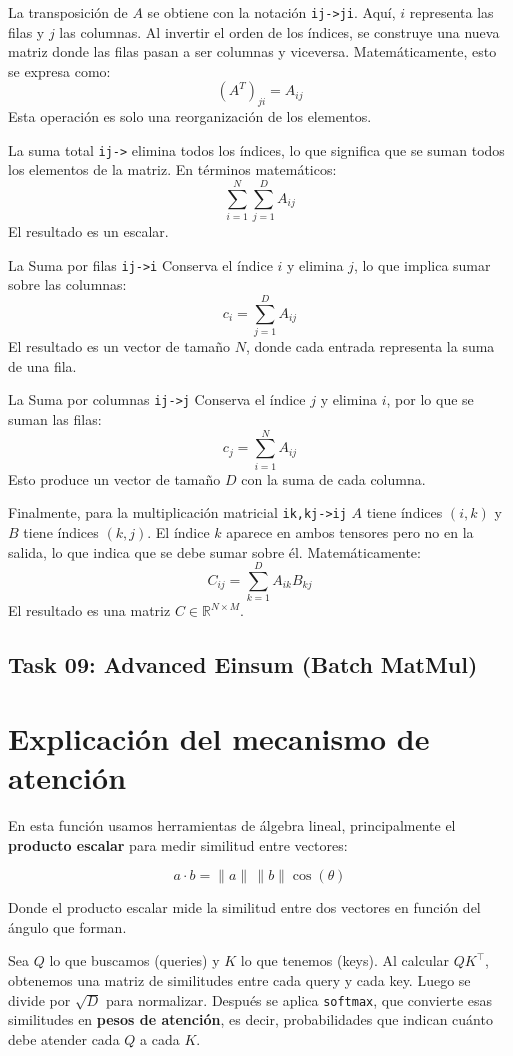 \documentclass[12pt]{article}
\begin{document}
La transposición de $A$ se obtiene con la notación \texttt{ij->ji}. Aquí, $i$ representa las filas y $j$ las columnas. Al invertir el orden de los índices, se construye una nueva matriz donde las filas pasan a ser columnas y viceversa. Matemáticamente, esto se expresa como:
$$
    (A^T)_{ji} = A_{ij}
$$
Esta operación es solo una reorganización de los elementos.


La suma total \texttt{ij->} elimina todos los índices, lo que significa que se suman todos los elementos de la matriz. En términos matemáticos:
$$
    \sum_{i=1}^{N} \sum_{j=1}^{D} A_{ij}
$$
El resultado es un escalar.


La Suma por filas \texttt{ij->i} Conserva el índice $i$ y elimina $j$, lo que implica sumar sobre las columnas:
    $$
        c_i = \sum_{j=1}^{D} A_{ij}
    $$
El resultado es un vector de tamaño $N$, donde cada entrada representa la suma de una fila.

La Suma por columnas \texttt{ij->j} Conserva el índice $j$ y elimina $i$, por lo que se suman las filas:
    $$
        c_j = \sum_{i=1}^{N} A_{ij}
    $$
Esto produce un vector de tamaño $D$ con la suma de cada columna.



Finalmente, para la multiplicación matricial \texttt{ik,kj->ij} $A$ tiene índices $(i,k)$ y $B$ tiene índices $(k,j)$. El índice $k$ aparece en ambos tensores pero no en la salida, lo que indica que se debe sumar sobre él. Matemáticamente:
$$
    C_{ij} = \sum_{k=1}^{D} A_{ik} B_{kj}
$$
El resultado es una matriz $C \in \mathbb{R}^{N \times M}$. 

\subsection*{Task 09: Advanced Einsum (Batch MatMul)}
\section{Explicación del mecanismo de atención}

En esta función usamos herramientas de álgebra lineal, principalmente el \textbf{producto escalar} para medir similitud entre vectores:


\[
a \cdot b = \|a\| \, \|b\| \cos(\theta)
\]


Donde el producto escalar mide la similitud entre dos vectores en función del ángulo que forman.

Sea $Q$ lo que buscamos (queries) y $K$ lo que tenemos (keys). Al calcular $QK^{\top}$, obtenemos una matriz de similitudes entre cada query y cada key. Luego se divide por $\sqrt{D}$ para normalizar. Después se aplica \texttt{softmax}, que convierte esas similitudes en \textbf{pesos de atención}, es decir, probabilidades que indican cuánto debe atender cada $Q$ a cada $K$.
\end{document}
